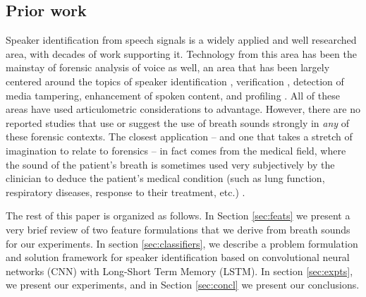 \documentclass[a4paper]{article}
\begin{document}
\subsection{Prior work} Speaker identification from speech signals is a widely applied and well researched area, with decades of work supporting it. Technology from this area has been the mainstay of forensic analysis of voice as well, an area that has been largely centered around the topics of speaker identification  \cite{meuwly2009forensic, champod2000inference, rose2003forensic, campbell2009forensic}, verification  \cite{becker2008forensic, reynolds2000speaker}, detection of media tampering, enhancement of spoken content, and profiling  \cite{singhprofiling, singhmipro2016}. All of these areas have used articulometric considerations to advantage. However, there are no reported studies that use or suggest the use of breath sounds strongly in \textit{any} of these forensic contexts. The closest application -- and one that takes a stretch of imagination to relate to forensics -- in fact comes from the medical field, where the sound of the patient's breath is sometimes used very subjectively by the clinician to deduce the patient's medical condition (such as lung function, respiratory diseases, response to their treatment, etc.)  \cite{loudon1988volumes, henderson1965temporal, winkworth1995breathing}.

The rest of this paper is organized as follows. In Section \ref{sec:feats} we present a very brief review of two feature formulations that we derive from breath sounds for our experiments. In section \ref{sec:classifiers}, we describe a problem formulation and solution framework for speaker identification based on convolutional neural networks (CNN) with Long-Short Term Memory (LSTM). In section \ref{sec:expts}, we present our experiments, and in Section \ref{sec:concl} we present our conclusions.
\end{document}
